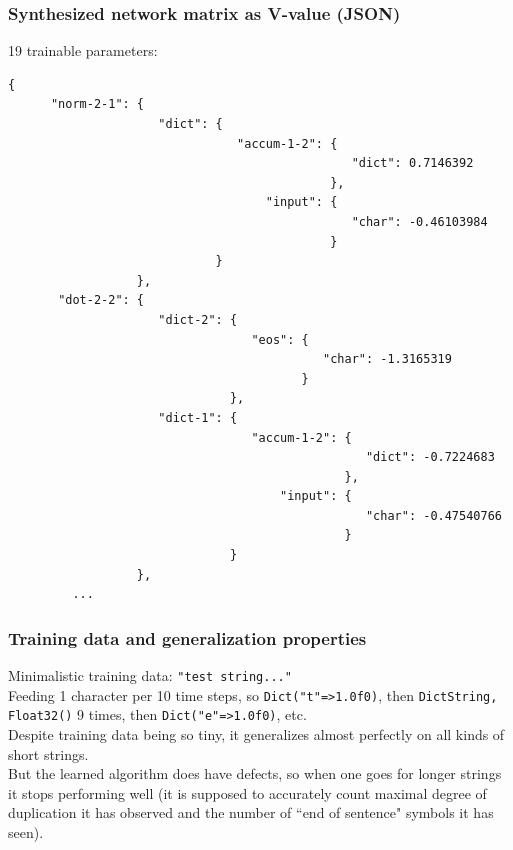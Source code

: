 \documentclass{beamer}
\newcommand{\msmagenta}[1]{{\color{mymagenta} #1}}
\begin{document}
\begin{frame}[fragile]

  \frametitle{Synthesized network matrix as V-value (JSON)}

\msmagenta{19 trainable parameters}:

{\tiny
\begin{verbatim}
{
      "norm-2-1": {
                     "dict": {
                                "accum-1-2": {
                                                "dict": 0.7146392
                                             },
                                    "input": {
                                                "char": -0.46103984
                                             }
                             }
                  },
       "dot-2-2": {
                     "dict-2": {
                                  "eos": {
                                            "char": -1.3165319
                                         }
                               },
                     "dict-1": {
                                  "accum-1-2": {
                                                  "dict": -0.7224683
                                               },
                                      "input": {
                                                  "char": -0.47540766
                                               }
                               }
                  },
         ...
\end{verbatim}
}

\end{frame}


\begin{frame}

  \frametitle{Training data and generalization properties}

Minimalistic training data: {\tt\small "test string..."}\\[2ex]

Feeding 1 character per 10 time steps, so {\tt\small Dict("t"=>1.0f0)}, then
{\tt\small Dict{String, Float32}()} 9 times, then {\tt\small Dict("e"=>1.0f0)}, etc.\\[2ex]

\msmagenta{Despite training data being so tiny, it generalizes almost perfectly on all kinds of short
strings.}\\[2ex]

But the learned algorithm does have defects, so when one goes for longer strings
it stops performing well (it is supposed to accurately count maximal degree of duplication
it has observed and the number of ``end of sentence" symbols it has seen).

\end{frame}
\end{document}
